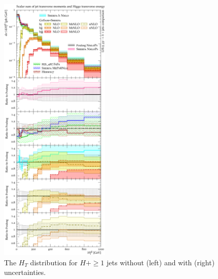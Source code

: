 \begin{figure}[t!]
  \includegraphics[width=0.47\textwidth]{figures/hjetscomp_HT_all.pdf}
  \caption{
    The $H_T$ distribution for $H+\ge1$ jets 
    without (left) and with (right) uncertainties.
    \label{fig:higgscomp:results:mobs:HT_all}
  }
\end{figure}

